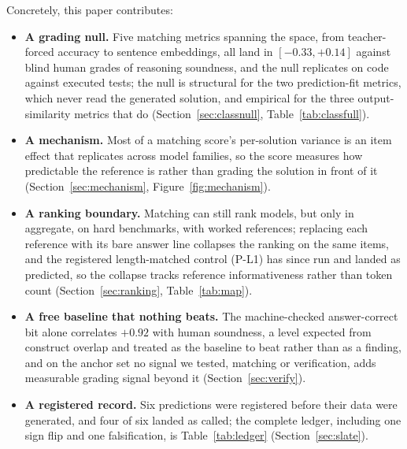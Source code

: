 Concretely, this paper contributes:
\begin{itemize}
\item \textbf{A grading null.} Five matching metrics spanning the space, from teacher-forced accuracy to sentence embeddings, all land in $[-0.33, +0.14]$ against blind human grades of reasoning soundness, and the null replicates on code against executed tests; the null is structural for the two prediction-fit metrics, which never read the generated solution, and empirical for the three output-similarity metrics that do (Section~\ref{sec:classnull}, Table~\ref{tab:classfull}).
\item \textbf{A mechanism.} Most of a matching score's per-solution variance is an item effect that replicates across model families, so the score measures how predictable the reference is rather than grading the solution in front of it (Section~\ref{sec:mechanism}, Figure~\ref{fig:mechanism}).
\item \textbf{A ranking boundary.} Matching can still rank models, but only in aggregate, on hard benchmarks, with worked references; replacing each reference with its bare answer line collapses the ranking on the same items, and the registered length-matched control (P-L1) has since run and landed as predicted, so the collapse tracks reference informativeness rather than token count (Section~\ref{sec:ranking}, Table~\ref{tab:map}).
\item \textbf{A free baseline that nothing beats.} The machine-checked answer-correct bit alone correlates $+0.92$ with human soundness, a level expected from construct overlap and treated as the baseline to beat rather than as a finding, and on the anchor set no signal we tested, matching or verification, adds measurable grading signal beyond it (Section~\ref{sec:verify}).
\item \textbf{A registered record.} Six predictions were registered before their data were generated, and four of six landed as called; the complete ledger, including one sign flip and one falsification, is Table~\ref{tab:ledger} (Section~\ref{sec:slate}).
\end{itemize}

